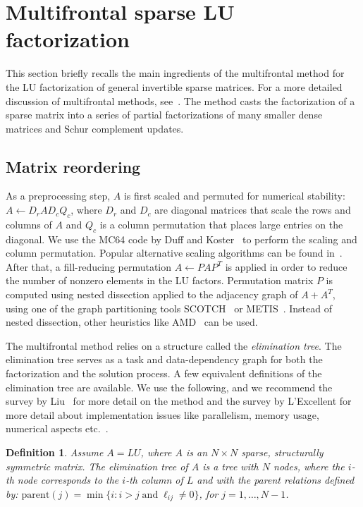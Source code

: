 \documentclass{article}
\newtheorem{mydef}{Definition}
\begin{document}
\section{Multifrontal sparse LU factorization}\label{sec:MF}
This section briefly recalls the main ingredients of the multifrontal
method for the LU factorization of general invertible sparse
matrices. For a more detailed discussion of multifrontal methods,
see~\cite{duff1983multifrontal,liu1992multifrontal}.  The method casts
the factorization of a sparse matrix into a series of partial
factorizations of many smaller dense matrices and Schur complement
updates.


\subsection{Matrix reordering}
As a preprocessing step, $A$ is first scaled and permuted for
numerical stability: $A \gets D_r A D_c Q_c$, where $D_r$ and $D_c$
are diagonal matrices that scale the rows and columns of $A$ and $Q_c$
is a column permutation that places large entries on the diagonal. We
use the MC64 code by Duff and Koster~\cite{duff1999design} to perform
the scaling and column permutation. Popular alternative scaling
algorithms can be found
in~\cite{ruiz2001scaling,amestoy2008parallel,curtis1972automatic}.
After that, a fill-reducing permutation $A \gets P A P^T$ is applied
in order to reduce the number of nonzero elements in the LU
factors. Permutation matrix $P$ is computed using nested dissection
applied to the adjacency graph of $A+A^T$, using one of the graph
partitioning tools SCOTCH~\cite{pellegrini1996scotch} or
METIS~\cite{karypis1998fast}. Instead of nested dissection, other
heuristics like AMD~\cite{amestoy1996amd} can be used.

The multifrontal method relies on a structure called the
\emph{elimination tree}. The elimination tree serves as a task and
data-dependency graph for both the factorization and the solution
process. A few equivalent definitions of the elimination tree are
available. We use the following, and we recommend the survey by
Liu~\cite{liu1992multifrontal} for more detail on the method and the
survey by L'Excellent for more detail about implementation issues like
parallelism, memory usage, numerical aspects
etc.~\cite{lexcellent2012multifrontal}.
\begin{mydef}
  Assume $A=LU$, where $A$ is an $N \times N$ sparse, structurally
  symmetric matrix. The elimination tree of $A$ is a tree with $N$
  nodes, where the $i$-th node corresponds to the $i$-th column of $L$
  and with the parent relations defined by: $\mathrm{parent}(j) =
  \min\{i: i>j \;\mathrm{and}\; \ell_{ij}\neq 0\}$, for $j=1,\ldots,
  N-1$.
\end{mydef}
\end{document}
